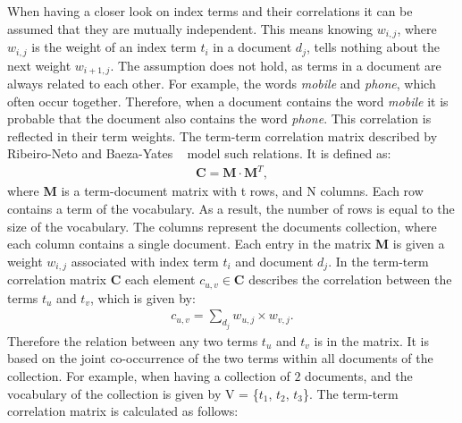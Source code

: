 When having a closer look on index terms and their correlations it can be assumed that they are mutually independent. This means knowing $w_{i, j}$, where $w_{i, j}$ is the weight of an index term $t_i$ in a document $d_j$, tells nothing about the next weight $w_{i + 1, j}$. The assumption does not hold, as terms in a document are always related to each other. For example, the words \textit{mobile} and \textit{phone}, which often occur together. Therefore, when a document contains the word \textit{mobile} it is probable that the document also contains the word \textit{phone}. This correlation is reflected in their term weights. The term-term correlation matrix described by Ribeiro-Neto and Baeza-Yates ~\cite{ModernInvormationRetrieval1999} model such relations. It is defined as:
\begin{align}
  \textbf{C} = \textbf{M} \cdot \textbf{M}^T,
\end{align}
where \textbf{M} is a term-document matrix with t rows, and N columns. Each row contains a term of the vocabulary. As a result, the number of rows is equal to the size of the vocabulary. The columns represent the documents collection, where each column contains a single document. Each entry in the matrix \textbf{M} is given a weight $w_{i, j}$ associated with index term $t_i$ and document $d_j$. In the term-term correlation matrix \textbf{C} each element $c_{u, v} \in \textbf{C}$ describes the correlation between the terms $t_u$ and $t_v$, which is given by:
\begin{align}
  c_{u, v} = \sum_{d_j}w_{u, j} \times w_{v, j}.
\end{align}
Therefore the relation between any two terms $t_u$ and $t_v$ is in the matrix. It is based on the joint co-occurrence of the two terms within all documents of the collection. For example, when having a collection of $2$ documents, and the vocabulary of the collection is given by V = \{$t_1$, $t_2$, $t_3$\}. The term-term correlation matrix is calculated as follows:
